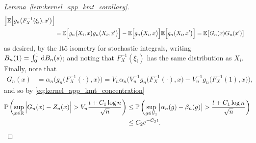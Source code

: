 \begin{proof}[Lemma~\ref{lem:kernel_app_kmt_corollary}]
\begin{align*}
    \Big]
    \mathbb{E}\Big[
      g_n\big(F_X^{-1}(\xi_i), x'\big)
    \Big] \\
    &=
    \mathbb{E}\Big[
      g_n\big(X_i, x\big)
      g_n\big(X_i, x'\big)
    \Big]
    - \mathbb{E}\Big[
      g_n\big(X_i, x\big)
    \Big]
    \mathbb{E}\Big[
      g_n\big(X_i, x'\big)
    \Big]
    =
    \mathbb{E}\big[
      G_n(x)
      G_n(x')
    \big]
  \end{align*}
  as desired, by the It\^o isometry for stochastic integrals,
  writing $B_n(1) = \int_0^1 \,\mathrm{d}B_n(s)$;
  and noting that $F_X^{-1}(\xi_i)$
  has the same distribution as $X_i$.
  Finally, note that
  \begin{align*}
    G_n(x)
    &=
    \alpha_n \Big(g_n\big(F_X^{-1}(\cdot), x\big)\Big)
    = V_n \alpha_n \Big(
      V_n^{-1} g_n\big(F_X^{-1}(\cdot), x\big)
      - V_n^{-1} g_n\big(F_X^{-1}(1), x\big)
    \Big),
  \end{align*}
  and so by \eqref{eq:kernel_app_kmt_concentration}
  \begin{align*}
    \mathbb{P}\left(
      \sup_{x \in \mathbb{R}}
      \Big|G_n(x) - Z_n(x)\Big|
      > V_n \frac{t + C_1 \log n}{\sqrt n}
    \right)
    &\leq
    \mathbb{P}\left(
      \sup_{g \in \mathcal{V}_1}
      \big|\alpha_n(g) - \beta_n(g)\big|
      > \frac{t + C_1\log n}{\sqrt{n}}
    \right) \\
    &\leq C_2 e^{-C_3 t}.
  \end{align*}
\end{proof}

